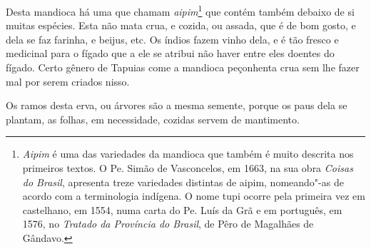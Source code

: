 \begin{linenumbers}
 Desta mandioca há uma que chamam \textit{aipim}\footnote{ \textit{Aipim} 
é uma das variedades da mandioca que também é muito
descrita nos primeiros textos. O Pe. Simão de Vasconcelos, em 1663, na
sua obra \textit{Coisas do Brasil}, apresenta treze variedades
distintas de aipim, nomeando"-as de acordo com a terminologia indígena.
O nome tupi ocorre pela primeira vez em castelhano, em 1554, numa
carta do Pe. Luís da Grã e em português, em 1576, no
\textit{Tratado da Província do Brasil}, de Pêro de Magalhães de Gândavo.} 
 que contém também debaixo de si muitas espécies. Esta não mata crua, e
cozida, ou assada, que é de bom gosto, e dela se faz farinha, e beijus,
etc. Os índios fazem vinho dela, e é tão fresco e medicinal para o
fígado que a ele se atribui não haver entre eles doentes do fígado.
Certo gênero de Tapuias come a mandioca peçonhenta crua sem lhe fazer
mal por serem criados nisso.

 Os ramos desta erva, ou árvores são a mesma semente, porque os paus
dela se plantam, as folhas, em necessidade, cozidas servem de mantimento. 

\enlargethispage{\baselineskip}


\end{linenumbers}
